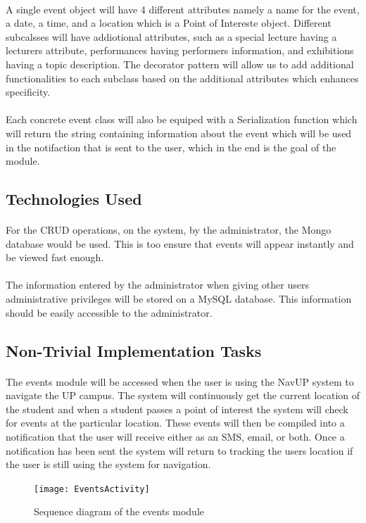 \documentclass{article}
\begin{document}
\paragraph{} A single event object will have 4 different attributes namely a name for the event, a date, a time, and a location which is a Point of Intereste object. Different subcalsses will have addiotional attributes, such as a special lecture having a lecturers attribute, performances having performers information, and exhibitions having a topic description. The decorator pattern will allow us to add additional functionalities to each subclass based on the additional attributes which enhances specificity. 

\paragraph{} Each concrete event class will also be equiped with a Serialization function which will return the string containing information about the event which will be used in the notifaction that is sent to the user, which in the end is the goal of the module.  

\subsection{Technologies Used}
\paragraph{} For the CRUD operations, on the system, by the administrator, the Mongo database would be used. This is too ensure that events will appear instantly and be viewed fast enough.

\paragraph{} The information entered by the administrator when giving other users administrative privileges will be stored on a MySQL database. This information should be easily accessible to the administrator.


\subsection{Non-Trivial Implementation Tasks}
\paragraph{} The events module will be accessed when the user is using the NavUP system to navigate the UP campus. The system will continuously get the current location of the student and when a student passes a point of interest the system will check for events at the particular location. These events will then be compiled into a notification that the user will receive either as an SMS, email, or both. Once a notification has been sent the system will return to tracking the users location if the user is still using the system for navigation.\\

\begin{figure}[H]
\centering
\texttt{[image: EventsActivity]}
\caption{Sequence diagram of the events module}
\end{figure}
\end{document}
